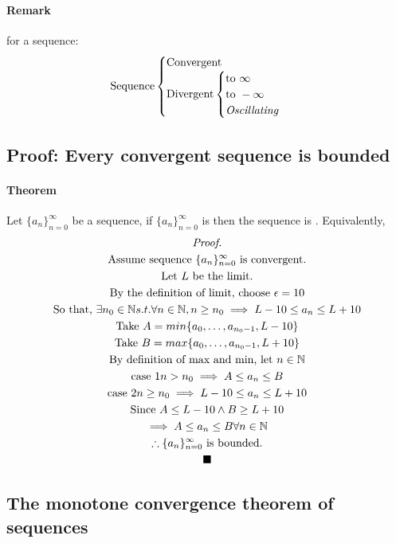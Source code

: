 \documentclass{article}
\newcommand{\theorem}[0]{\paragraph{Theorem}}
\newcommand{\sequence}[3]{\{#1_{n}\}_{n={#2}}^{#3}}
\newcommand{\N}[0]{\mathbb{N}}
\begin{document}
\paragraph{Remark} for a sequence: 
\[
\text{Sequence} \begin{cases}
	\text{Convergent} \\
	\text{Divergent}
	\begin{cases}
		\text{to } \infty \\
		\text{to } -\infty \\
		\emph{Oscillating} \\
	\end{cases} \\
\end{cases}
\]

\subsection{Proof: Every convergent sequence is bounded}
\theorem Let $\sequence{a}{0}{\infty}$ be a sequence, if $\sequence{a}{0}{\infty}$ is  then the sequence is . Equivalently,
\begin{multline*}
	\emph{Proof.} \\
	\text{Assume sequence } \sequence{a}{0}{\infty} \text{ is convergent.} \\
	\text{Let $L$ be the limit.} \\
	\text{By the definition of limit, choose } \epsilon = 10 \\
	\text{So that, }\exists n_0 \in \N s.t. \forall n \in \N, n \geq n_0 \implies L-10 \leq a_n \leq L + 10 \\
	\text{Take } A = min\{a_0,\dots,a_{n_0 - 1}, L - 10\} \\
	\text{Take } B = max\{a_0,\dots,a_{n_0 - 1}, L + 10\} \\
	\text{By definition of max and min, let }n \in \N \\
	\text{case 1} n > n_0 \implies A \leq a_n \leq B \\
	\text{case 2} n \geq n_0 \implies L-10 \leq a_n \leq L + 10 \\
	\text{Since } A \leq L-10 \land B \geq L + 10 \\
	\implies A \leq a_n \leq B \forall n \in \N \\
	\therefore \sequence{a}{0}{\infty} \text{ is bounded.} \\
	\blacksquare
\end{multline*}

\subsection{The monotone convergence theorem of sequences}
\end{document}
